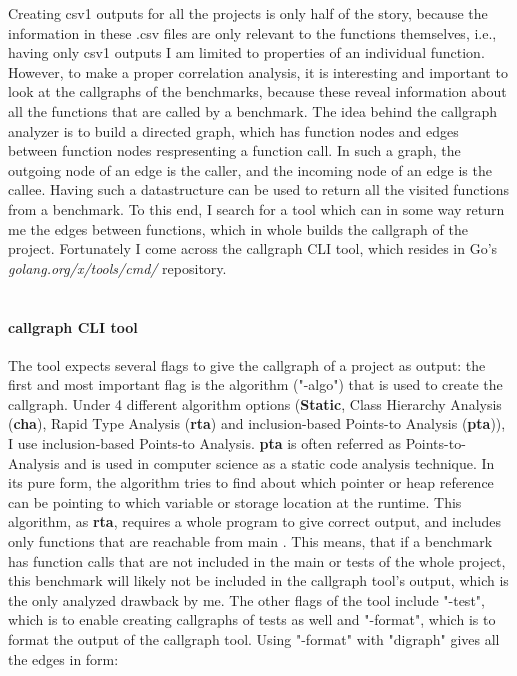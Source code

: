 \documentclass{seal_thesis}
\begin{document}
Creating csv1 outputs for all the projects is only half of the story, because the information in these .csv files are only relevant to the functions themselves, i.e., having only csv1 outputs I am limited to properties of an individual function. However, to make a proper correlation analysis, it is interesting and important to look at the callgraphs of the benchmarks, because these reveal information about all the functions that are called by a benchmark. The idea behind the callgraph analyzer is to build a directed graph, which has function nodes and edges between function nodes respresenting a function call. In such a graph, the outgoing node of an edge is the caller, and the incoming node of an edge is the callee. Having such a datastructure can be used to return all the visited functions from a benchmark. To this end, I search for a tool which can in some way return me the edges between functions, which in whole builds the callgraph of the project. Fortunately I come across the callgraph CLI tool, which resides in Go's \textit{golang.org/x/tools/cmd/} repository\cite{callgraphtool}.\\
\\
\paragraph{callgraph CLI tool} The tool expects several flags to give the callgraph of a project as output: the first and most important flag is the algorithm ("-algo") that is used to create the callgraph. Under 4 different algorithm options (\textbf{Static}, Class Hierarchy Analysis (\textbf{cha}), Rapid Type Analysis (\textbf{rta}) and inclusion-based Points-to Analysis (\textbf{pta})), I use inclusion-based Points-to Analysis. \textbf{pta} is often referred as Points-to-Analysis and is used in computer science as a static code analysis technique. In its pure form, the algorithm tries to find about which pointer or heap reference can be pointing to which variable or storage location at the runtime. This algorithm, as \textbf{rta}, requires a whole program to give correct output, and includes only functions that are reachable from main \cite{callgraphtool}. This means, that if a benchmark has function calls that are not included in the main or tests of the whole project, this benchmark will likely not be included in the callgraph tool's output, which is the only analyzed drawback by me. The other flags of the tool include "-test", which is to enable creating callgraphs of tests as well and "-format", which is to format the output of the callgraph tool. Using "-format" with "digraph" gives all the edges in form:
\end{document}
